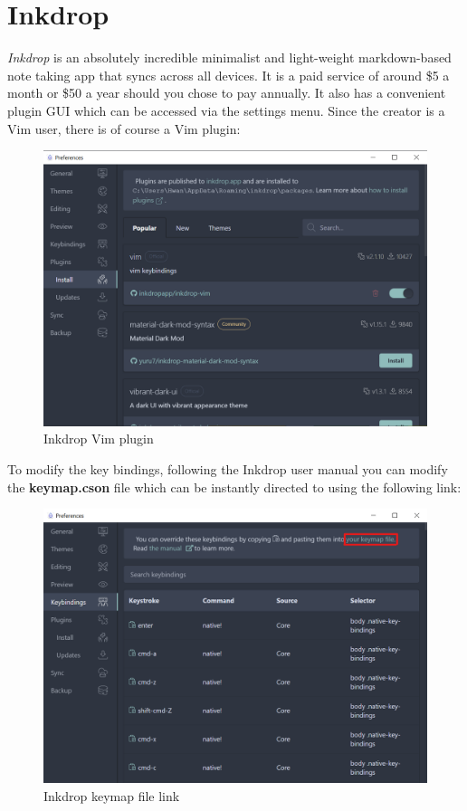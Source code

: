 \section{Inkdrop}
\emph{Inkdrop} \cite{matsuyamainkdrop} is an absolutely incredible minimalist and
light-weight markdown-based note taking app that syncs across all devices.
It is a paid service of around \$5 a month or \$50 a year should you chose to
pay annually. It also has a convenient plugin GUI which can be accessed via the
settings menu. Since the creator is a Vim user, there is of course a Vim
plugin:
\begin{figure}[H]
    \centering
    \includegraphics[scale=\figscale]{Figures/inkdrop_vim_plugin.png}
    \caption{Inkdrop Vim plugin}
    \label{FigInkdropVimPlugin}
\end{figure}
To modify the key bindings, following the Inkdrop user manual
\cite{matsuyamacustomizing} you can modify the \textbf{keymap.cson} file which
can be instantly directed to using the following link:
\begin{figure}[H]
    \centering
    \includegraphics[scale=\figscale]{Figures/inkdrop_keymap_file.png}
    \caption{Inkdrop keymap file link}
    \label{FigInkdropKeymapFile}
\end{figure}
